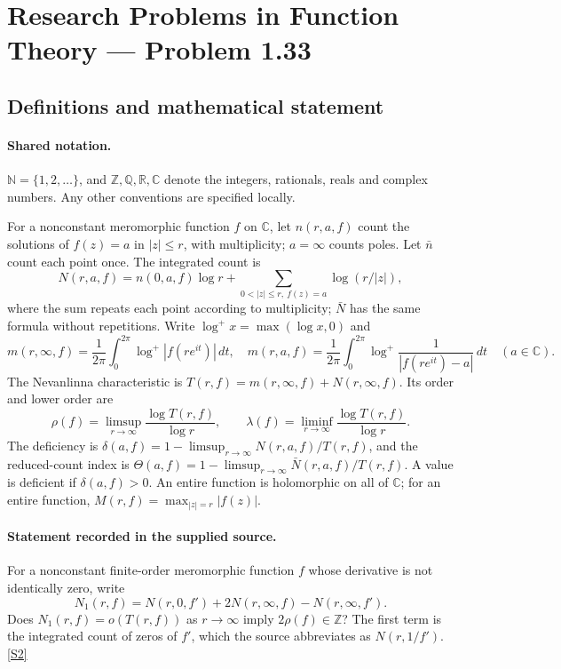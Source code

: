 \documentclass[11pt]{article}
\newcommand{\sref}[2]{\hyperlink{source:#1:#2}{[S#2]}}
\begin{document}
\section{Research Problems in Function Theory — Problem 1.33}\label{statement}

\subsection{Definitions and mathematical statement}

\paragraph{Shared notation.}$\mathbb N=\{1,2,\ldots\}$, and $\mathbb Z,\mathbb Q,\mathbb R,\mathbb C$ denote the integers, rationals, reals and complex numbers. Any other conventions are specified locally.


For a nonconstant meromorphic function $f$ on $\mathbb C$, let $n(r,a,f)$ count the solutions of $f(z)=a$ in $|z|\le r$, with multiplicity; $a=\infty$ counts poles. Let $\bar n$ count each point once. The integrated count is
\[
 N(r,a,f)=n(0,a,f)\log r+\sum_{0<|z|\le r,\ f(z)=a}\log(r/|z|),
\]
where the sum repeats each point according to multiplicity; $\bar N$ has the same formula without repetitions. Write $\log^+x=\max(\log x,0)$ and
\[
 m(r,\infty,f)=\frac1{2\pi}\int_0^{2\pi}\log^+|f(re^{it})|\,dt,\quad
 m(r,a,f)=\frac1{2\pi}\int_0^{2\pi}\log^+\frac1{|f(re^{it})-a|}\,dt\quad(a\in\mathbb C).
\]
The Nevanlinna characteristic is $T(r,f)=m(r,\infty,f)+N(r,\infty,f)$. Its order and lower order are
\[
 \rho(f)=\limsup_{r\to\infty}\frac{\log T(r,f)}{\log r},\qquad
 \lambda(f)=\liminf_{r\to\infty}\frac{\log T(r,f)}{\log r}.
\]
The deficiency is $\delta(a,f)=1-\limsup_{r\to\infty}N(r,a,f)/T(r,f)$, and the reduced-count index is $\Theta(a,f)=1-\limsup_{r\to\infty}\bar N(r,a,f)/T(r,f)$. A value is deficient if $\delta(a,f)>0$. An entire function is holomorphic on all of $\mathbb C$; for an entire function, $M(r,f)=\max_{|z|=r}|f(z)|$.
\paragraph{Statement recorded in the supplied source.}
For a nonconstant finite-order meromorphic function $f$ whose derivative is not identically zero, write
\[
 N_1(r,f)=N(r,0,f')+2N(r,\infty,f)-N(r,\infty,f').
\]
Does $N_1(r,f)=o(T(r,f))$ as $r\to\infty$ imply $2\rho(f)\in\mathbb Z$? The first term is the integrated count of zeros of $f'$, which the source abbreviates as $N(r,1/f')$. \sref{statement}{2}
\end{document}
